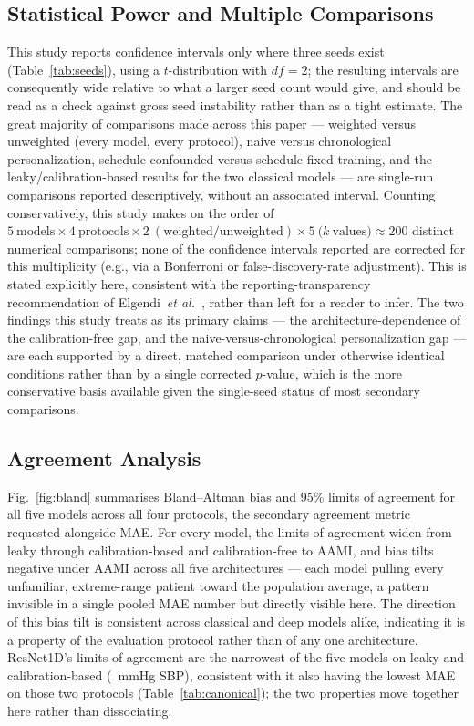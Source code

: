 \documentclass[journal]{IEEEtran}
\begin{document}
\subsection{Statistical Power and Multiple Comparisons}
This study reports confidence intervals only where three seeds exist (Table~\ref{tab:seeds}), using a $t$-distribution with $df=2$; the resulting intervals are consequently wide relative to what a larger seed count would give, and should be read as a check against gross seed instability rather than as a tight estimate. The great majority of comparisons made across this paper --- weighted versus unweighted (every model, every protocol), naive versus chronological personalization, schedule-confounded versus schedule-fixed training, and the leaky/calibration-based results for the two classical models --- are single-run comparisons reported descriptively, without an associated interval. Counting conservatively, this study makes on the order of $5~\mathrm{models} \times 4~\mathrm{protocols} \times 2~\mathrm{(weighted/unweighted)} \times 5~\mathrm{(}k\mathrm{\ values)} \approx 200$ distinct numerical comparisons; none of the confidence intervals reported are corrected for this multiplicity (e.g., via a Bonferroni or false-discovery-rate adjustment). This is stated explicitly here, consistent with the reporting-transparency recommendation of Elgendi~\textit{et al.}~\cite{elgendi2024}, rather than left for a reader to infer. The two findings this study treats as its primary claims --- the architecture-dependence of the calibration-free gap, and the naive-versus-chronological personalization gap --- are each supported by a direct, matched comparison under otherwise identical conditions rather than by a single corrected $p$-value, which is the more conservative basis available given the single-seed status of most secondary comparisons.

\subsection{Agreement Analysis}
Fig.~\ref{fig:bland} summarises Bland--Altman bias and 95\% limits of agreement for all five models across all four protocols, the secondary agreement metric requested alongside MAE. For every model, the limits of agreement widen from leaky through calibration-based and calibration-free to AAMI, and bias tilts negative under AAMI across all five architectures --- each model pulling every unfamiliar, extreme-range patient toward the population average, a pattern invisible in a single pooled MAE number but directly visible here. The direction of this bias tilt is consistent across classical and deep models alike, indicating it is a property of the evaluation protocol rather than of any one architecture. ResNet1D's limits of agreement are the narrowest of the five models on leaky and calibration-based (~mmHg SBP), consistent with it also having the lowest MAE on those two protocols (Table~\ref{tab:canonical}); the two properties move together here rather than dissociating.
\end{document}
